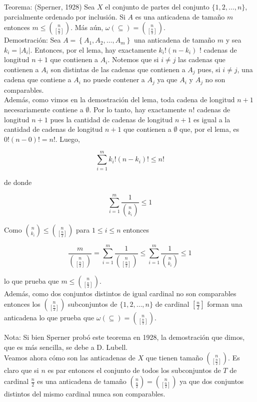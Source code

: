 \documentclass[10pt]{article}
\begin{document}
Teorema: (Sperner, 1928) Sea $X$ el conjunto de partes del conjunto $\{1,2, \ldots, n\}$, parcialmente ordenado por inclusión. Si $A$ es una anticadena de tamaño $m$ entonces $m \leq\binom{ n}{\left[\frac{n}{2}\right]}$. Más aún, $\omega(\subseteq)=\binom{n}{\left[\frac{n}{2}\right]}$.\\
Demostración: Sea $A=\left\{A_{1}, A_{2}, \ldots, A_{m}\right\}$ una anticadena de tamaño $m$ y sea $k_{i}=\left|A_{i}\right|$. Entonces, por el lema, hay exactamente $k_{i}!\left(n-k_{i}\right)$ ! cadenas de longitud $n+1$ que contienen a $A_{i}$. Notemos que si $i \neq j$ las cadenas que contienen a $A_{i}$ son distintas de las cadenas que contienen a $A_{j}$ pues, si $i \neq j$, una cadena que contiene a $A_{i}$ no puede contener a $A_{j}$ ya que $A_{i}$ y $A_{j}$ no son comparables.\\
Además, como vimos en la demostración del lema, toda cadena de longitud $n+1$ necesariamente contiene a $\emptyset$. Por lo tanto, hay exactamente $n!$ cadenas de longitud $n+1$ pues la cantidad de cadenas de longitud $n+1$ es igual a la cantidad de cadenas de longitud $n+1$ que contienen a $\emptyset$ que, por el lema, es $0!(n-0)!=n!$. Luego,

$$
\sum_{i=1}^{m} k_{i}!\left(n-k_{i}\right)!\leq n!
$$

de donde

$$
\sum_{i=1}^{m} \frac{1}{\binom{n}{k_{i}}} \leq 1
$$

Como $\binom{n}{k_{i}} \leq\binom{ n}{\left[\frac{n}{2}\right]}$ para $1 \leq i \leq n$ entonces

$$
\frac{m}{\binom{n}{\left[\frac{n}{2}\right]}}=\sum_{i=1}^{m} \frac{1}{\binom{n}{\left[\frac{n}{2}\right]}} \leq \sum_{i=1}^{m} \frac{1}{\binom{n}{k_{i}}} \leq 1
$$

lo que prueba que $m \leq\binom{ n}{\left[\frac{n}{2}\right]}$.\\
Además, como dos conjuntos distintos de igual cardinal no son comparables entonces los $\binom{n}{\left[\frac{n}{2}\right]}$ subconjuntos de $\{1,2, \ldots, n\}$ de cardinal $\left[\frac{n}{2}\right]$ forman una anticadena lo que prueba que $\omega(\subseteq)=\binom{n}{\left[\frac{n}{2}\right]}$.

Nota: Si bien Sperner probó este teorema en 1928, la demostración que dimos, que es más sencilla, se debe a D. Lubell.\\
Veamos ahora cómo son las anticadenas de $X$ que tienen tamaño $\binom{n}{\left[\frac{n}{2}\right]}$. Es claro que si $n$ es par entonces el conjunto de todos los subconjuntos de $T$ de cardinal $\frac{n}{2}$ es una anticadena de tamaño $\binom{n}{\frac{n}{2}}=\binom{n}{\left[\frac{n}{2}\right]}$ ya que dos conjuntos distintos del mismo cardinal nunca son comparables.
\end{document}
